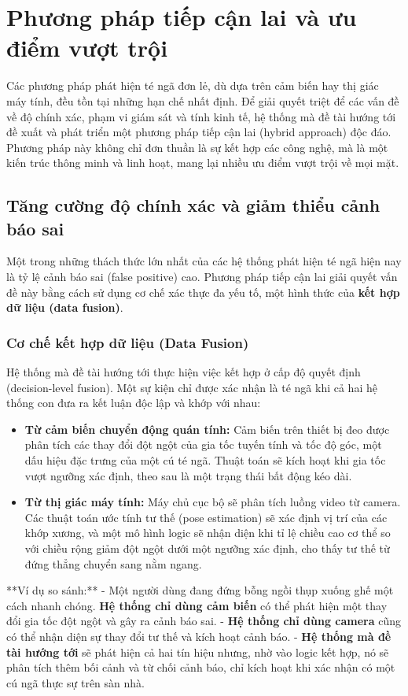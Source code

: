 \section{Phương pháp tiếp cận lai và ưu điểm vượt trội}

Các phương pháp phát hiện té ngã đơn lẻ, dù dựa trên cảm biến hay thị giác máy tính, đều tồn tại những hạn chế nhất định. Để giải quyết triệt để các vấn đề về độ chính xác, phạm vi giám sát và tính kinh tế, hệ thống mà đề tài hướng tới đề xuất và phát triển một phương pháp tiếp cận lai (hybrid approach) độc đáo. Phương pháp này không chỉ đơn thuần là sự kết hợp các công nghệ, mà là một kiến trúc thông minh và linh hoạt, mang lại nhiều ưu điểm vượt trội về mọi mặt.

\subsection{Tăng cường độ chính xác và giảm thiểu cảnh báo sai}

Một trong những thách thức lớn nhất của các hệ thống phát hiện té ngã hiện nay là tỷ lệ cảnh báo sai (false positive) cao. Phương pháp tiếp cận lai giải quyết vấn đề này bằng cách sử dụng cơ chế xác thực đa yếu tố, một hình thức của \textbf{kết hợp dữ liệu (data fusion)}.

\subsubsection{Cơ chế kết hợp dữ liệu (Data Fusion)}

Hệ thống mà đề tài hướng tới thực hiện việc kết hợp ở cấp độ quyết định (decision-level fusion). Một sự kiện chỉ được xác nhận là té ngã khi cả hai hệ thống con đưa ra kết luận độc lập và khớp với nhau:
\begin{itemize}
    \item \textbf{Từ cảm biến chuyển động quán tính:} Cảm biến trên thiết bị đeo được phân tích các thay đổi đột ngột của gia tốc tuyến tính và tốc độ góc, một dấu hiệu đặc trưng của một cú té ngã. Thuật toán sẽ kích hoạt khi gia tốc vượt ngưỡng xác định, theo sau là một trạng thái bất động kéo dài.
    \item \textbf{Từ thị giác máy tính:} Máy chủ cục bộ sẽ phân tích luồng video từ camera. Các thuật toán ước tính tư thế (pose estimation) sẽ xác định vị trí của các khớp xương, và một mô hình logic sẽ nhận diện khi tỉ lệ chiều cao cơ thể so với chiều rộng giảm đột ngột dưới một ngưỡng xác định, cho thấy tư thế từ đứng thẳng chuyển sang nằm ngang.
\end{itemize}
**Ví dụ so sánh:**
- Một người dùng đang đứng bỗng ngồi thụp xuống ghế một cách nhanh chóng. \textbf{Hệ thống chỉ dùng cảm biến} có thể phát hiện một thay đổi gia tốc đột ngột và gây ra cảnh báo sai.
- \textbf{Hệ thống chỉ dùng camera} cũng có thể nhận diện sự thay đổi tư thế và kích hoạt cảnh báo.
- \textbf{Hệ thống mà đề tài hướng tới} sẽ phát hiện cả hai tín hiệu nhưng, nhờ vào logic kết hợp, nó sẽ phân tích thêm bối cảnh và từ chối cảnh báo, chỉ kích hoạt khi xác nhận có một cú ngã thực sự trên sàn nhà.

